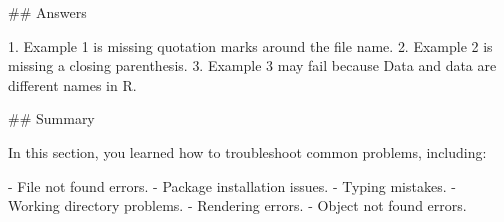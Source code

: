 \documentclass[
  letterpaper,
  DIV=11,
  numbers=noendperiod]{scrartcl}
\newenvironment{Shaded}{\begin{snugshade}}{\end{snugshade}}
\newcommand{\AttributeTok}[1]{\textcolor[rgb]{0.40,0.45,0.13}{#1}}
\newcommand{\NormalTok}[1]{\textcolor[rgb]{0.00,0.23,0.31}{#1}}
\newcommand{\StringTok}[1]{\textcolor[rgb]{0.13,0.47,0.30}{#1}}
\begin{document}
\begin{Shaded}
\begin{Highlighting}[]
\AttributeTok{\#\# Answers}

\AttributeTok{1. Example 1 is missing quotation marks around the file name.}
\AttributeTok{2. Example 2 is missing a closing parenthesis.}
\AttributeTok{3. Example 3 may fail because }\StringTok{\textasciigrave{}}\NormalTok{Data}\StringTok{\textasciigrave{}}\AttributeTok{ and }\StringTok{\textasciigrave{}}\NormalTok{data}\StringTok{\textasciigrave{}}\AttributeTok{ are different names in R.}

\AttributeTok{\#\# Summary}

\AttributeTok{In this section, you learned how to troubleshoot common problems, including:}

\AttributeTok{{-} File not found errors.}
\AttributeTok{{-} Package installation issues.}
\AttributeTok{{-} Typing mistakes.}
\AttributeTok{{-} Working directory problems.}
\AttributeTok{{-} Rendering errors.}
\AttributeTok{{-} Object not found errors.}
\end{Highlighting}
\end{Shaded}
\end{document}
